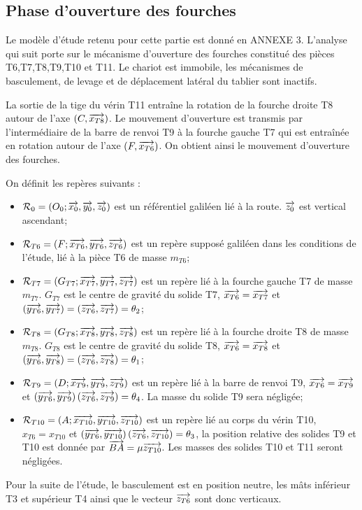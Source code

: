 \documentclass[10pt,fleqn]{article} %
\begin{document}
\subsection{Phase d'ouverture des fourches}
Le modèle d’étude retenu pour cette partie est donné en ANNEXE 3.
L’analyse qui suit porte sur le mécanisme d’ouverture des fourches constitué des pièces T6,T7,T8,T9,T10 et T11. Le chariot est immobile, les mécanismes de basculement, de levage et de déplacement latéral du tablier sont inactifs.

La sortie de la tige du vérin T11 entraîne la rotation de la fourche droite T8 autour de l’axe $\left(C,\overrightarrow{x_{T8}}\right)$. Le mouvement d’ouverture est transmis par l’intermédiaire de la barre de renvoi T9 à la fourche gauche T7 qui est entraînée en rotation autour de l’axe $\left(F,\overrightarrow{x_{T6}}\right)$. On obtient ainsi le mouvement d’ouverture des fourches.

On définit les repères suivants :
\begin{itemize}
\item $\mathcal{R}_0=\left(O_0;\overrightarrow{x_0},\overrightarrow{y_0},\overrightarrow{z_0} \right)$ est un référentiel galiléen lié à la route. $\overrightarrow{z_0}$ est vertical ascendant;
\item $\mathcal{R}_{T6}=\left(F;\overrightarrow{x_{T6}},\overrightarrow{y_{T6}},\overrightarrow{z_{T6}} \right)$  est un repère supposé galiléen dans les conditions de l’étude, lié à la pièce T6 de masse $m_{T6}$;
\item $\mathcal{R}_{T7}=\left(G_{T7};\overrightarrow{x_{T7}},\overrightarrow{y_{T7}},\overrightarrow{z_{T7}} \right)$  est un repère lié à la fourche gauche T7 de masse $m_{T7}$. $G_{T7}$ est le centre de gravité du solide T7, $\overrightarrow{x_{T6}}=\overrightarrow{x_{T7}}$ et $\left(\overrightarrow{{y_{T6}}},\overrightarrow{{y_{T7}}}\right)=\left(\overrightarrow{{z_{T6}}},\overrightarrow{{z_{T7}}}\right)=\theta_2$;
\item $\mathcal{R}_{T8}=\left(G_{T8};\overrightarrow{x_{T8}},\overrightarrow{y_{T8}},\overrightarrow{z_{T8}} \right)$  est un repère lié à la fourche droite T8 de masse $m_{T8}$. $G_{T8}$ est le centre de gravité du solide T8, $\overrightarrow{x_{T6}}=\overrightarrow{x_{T8}}$ et $\left(\overrightarrow{{y_{T6}}},\overrightarrow{{y_{T8}}}\right)=\left(\overrightarrow{{z_{T6}}},\overrightarrow{{z_{T8}}}\right)=\theta_1$;
\item $\mathcal{R}_{T9}=\left(D;\overrightarrow{x_{T9}},\overrightarrow{y_{T9}},\overrightarrow{z_{T9}} \right)$  est un repère lié à la barre de renvoi T9, $\overrightarrow{x_{T6}}=\overrightarrow{x_{T9}}$ et $\left(\overrightarrow{{y_{T6}}},\overrightarrow{{y_{T9}}}\right)\left(\overrightarrow{{z_{T6}}},\overrightarrow{{z_{T9}}}\right)=\theta_4$. La masse du solide T9 sera négligée;
\item $\mathcal{R}_{T10}=\left(A;\overrightarrow{x_{T10}},\overrightarrow{y_{T10}},\overrightarrow{z_{T10}} \right)$  est un repère lié au corps du vérin T10, ${x_{T6}}={x_{T10}}$ et $\left(\overrightarrow{{y_{T6}}},\overrightarrow{{y_{T10}}}\right)\left(\overrightarrow{{z_{T6}}},\overrightarrow{{z_{T10}}}\right)=\theta_3$, la position relative des solides T9 et T10 est donnée par $\overrightarrow{BA}=\mu\overrightarrow{z_{T10}}$. Les masses des solides T10 et T11 seront négligées.
\end{itemize}
Pour la suite de l'étude, le basculement est en position neutre, les mâts inférieur T3 et supérieur T4 ainsi que le vecteur $\overrightarrow{z_{T6}}$ sont donc verticaux. 
\end{document}
